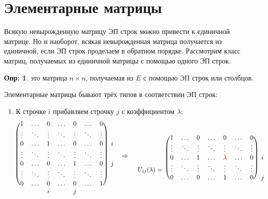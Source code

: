 \documentclass[12pt]{article}
\theoremstyle{definition}
\newtheorem{defn}{Опр:}
\begin{document}
\section*{Элементарные матрицы}
Всякую невырожденную матрицу ЭП строк можно привести к единичной матрице. Но и наоборот, всякая невырожденная матрица получается из единичной, если ЭП строк проделаем в обратном порядке. Рассмотрим класс матриц, получаемых из единичной матрицы с помощью одного ЭП строк. 
\begin{defn}
	 это матрица $n\times n$, получаемая из $E$ с помощью ЭП строк или столбцов.
\end{defn}
Элементарные матрицы бывают трёх типов в соответствии ЭП строк:
\begin{enumerate}[label = \arabic*)]
	\item К строчке $i$ прибавляем строчку $j$ с коэффициентом $\lambda$:
	$$
		\begin{blockarray}{ccccccccc}
			\begin{block}{(ccccccc)cc}
				1 & \dotsc & 0 & \dotsc & 0 & \dotsc & 0 & &\\
				\vdots & \ddots & \vdots & \ddots & \vdots & \ddots & \vdots & &\\
				0 & \dotsc & 1 & \dotsc & 0 & \dotsc & 0 & i&\\
				\vdots & \ddots & \vdots & \ddots & \vdots & \ddots & \vdots & &\Rightarrow\\
				0 & \dotsc & 0 & \dotsc & 1 & \dotsc & 0 & j\\
				\vdots & \ddots & \vdots & \ddots & \vdots & \ddots & \vdots &&\\
				0 & \dotsc & 0 & \dotsc & 0 & \dotsc & 1 &&\\
			\end{block}
				 &  & i &  & j &  &  &&\\
		\end{blockarray}	
		\begin{blockarray}{ccccccccc}
			\begin{block}{c(ccccccc)c}
				& 1 & \dotsc & 0 & \dotsc & 0 & \dotsc & 0 & \\
				& \vdots & \ddots & \vdots & \ddots & \vdots & \ddots & \vdots & \\
				& 0 & \dotsc & 1 & \dotsc & {\color{red}\lambda} & \dotsc & 0 & i\\
				U_{ij}(\lambda) =& \vdots & \ddots & \vdots & \ddots & \vdots & \ddots & \vdots & \\
				&0 & \dotsc & 0 & \dotsc & 1 & \dotsc & 0 & j\\

\end{block}
\end{blockarray}$$
\end{enumerate}
\end{document}

